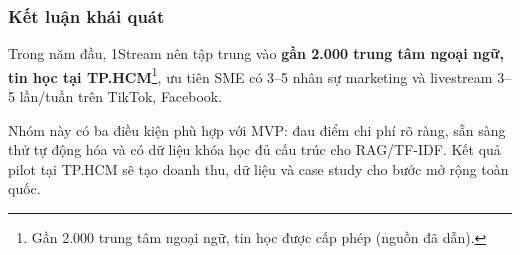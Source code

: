 
\subsubsection{Kết luận khái quát}

Trong năm đầu, 1Stream nên tập trung vào \textbf{gần 2.000 trung tâm ngoại ngữ, tin học tại TP.HCM}\footnote{Gần 2.000 trung tâm ngoại ngữ, tin học được cấp phép (nguồn đã dẫn).}, ưu tiên SME có 3--5 nhân sự marketing và livestream 3--5 lần/tuần trên TikTok, Facebook.

Nhóm này có ba điều kiện phù hợp với MVP: đau điểm chi phí rõ ràng, sẵn sàng thử tự động hóa và có dữ liệu khóa học đủ cấu trúc cho RAG/TF-IDF. Kết quả pilot tại TP.HCM sẽ tạo doanh thu, dữ liệu và case study cho bước mở rộng toàn quốc.


